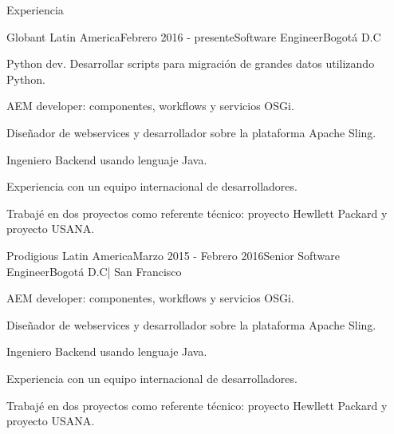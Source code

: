\documentclass[spanish]{resume} %
\begin{document}
\begin{rSection}{Experiencia}

\begin{rSubsection}{Globant Latin America}{Febrero 2016 - presente}{Software Engineer}{Bogot\'a D.C}
\item Python dev. Desarrollar scripts para migración de grandes datos utilizando Python.
\item AEM developer: componentes, workflows y servicios OSGi.
\item Diseñador de webservices y desarrollador sobre la plataforma Apache Sling.  
\item Ingeniero Backend usando lenguaje Java.
\item Experiencia con un equipo internacional de desarrolladores.
\item Trabajé en dos proyectos como referente técnico: proyecto Hewllett Packard y proyecto USANA.
\end{rSubsection}


\begin{rSubsection}{Prodigious Latin America}{Marzo 2015 - Febrero 2016}{Senior Software Engineer}{Bogot\'a D.C| San Francisco}
\item AEM developer: componentes, workflows y servicios OSGi.
\item Diseñador de webservices y desarrollador sobre la plataforma Apache Sling.  
\item Ingeniero Backend usando lenguaje Java.
\item Experiencia con un equipo internacional de desarrolladores.
\item Trabajé en dos proyectos como referente técnico: proyecto Hewllett Packard y proyecto USANA.
\end{rSubsection}



\end{rSection}
\end{document}
